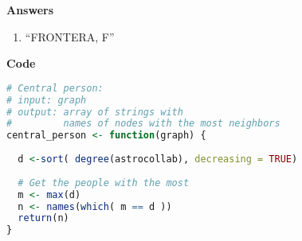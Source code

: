 \documentclass{article}
\begin{document}
\textbf{Answers}
\begin{enumerate}
	\item ``FRONTERA, F''
\end{enumerate}



\textbf{Code}
\begin{lstlisting}[language = R]
# Central person:
# input: graph
# output: array of strings with 
#         names of nodes with the most neighbors
central_person <- function(graph) {
  
  d <-sort( degree(astrocollab), decreasing = TRUE)
  
  # Get the people with the most
  m <- max(d)
  n <- names(which( m == d ))
  return(n)
}
\end{lstlisting}
\end{document}
